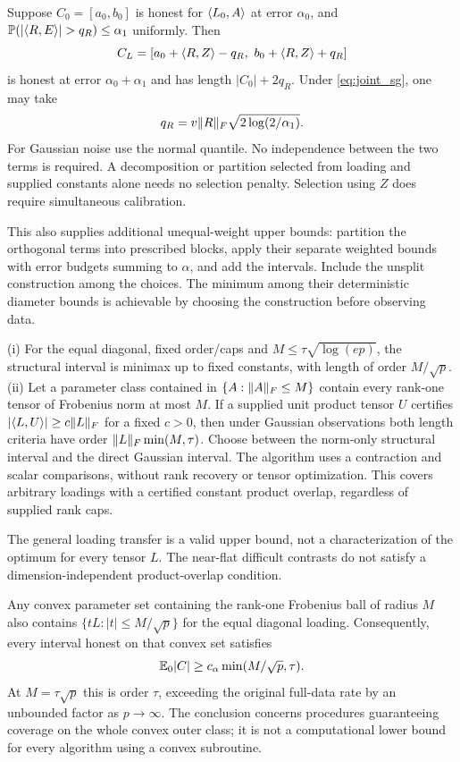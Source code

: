 \begin{proposition}\label{prop:loading_transfer}
Suppose $C_0=[a_0,b_0]$ is honest for $\langle L_0,A\rangle$ at error $\alpha_0$, and
$\PP(|\ip RE|>q_R)\le\alpha_1$ uniformly. Then
\[
 C_L=[a_0+\ip RZ-q_R,\ b_0+\ip RZ+q_R]
\]
is honest at error $\alpha_0+\alpha_1$ and has length $|C_0|+2q_R$.
Under \eqref{eq:joint_sg}, one may take
\[
 q_R=v\lVert R\rVert_F\sqrt{2\log(2/\alpha_1)}.
\]
For Gaussian noise use the normal quantile. No independence between the two terms is required. A decomposition or partition selected from loading and supplied constants alone needs no selection penalty. Selection using $Z$ does require simultaneous calibration.

This also supplies additional unequal-weight upper bounds: partition the orthogonal terms into prescribed blocks, apply their separate weighted bounds with error budgets summing to $\alpha$, and add the intervals. Include the unsplit construction among the choices. The minimum among their deterministic diameter bounds is achievable by choosing the construction before observing data.
\end{proposition}

\begin{theorem}\label{thm:efficient_regimes}
(i) For the equal diagonal, fixed order/caps and $M\le\tau\sqrt{\log(ep)}$, the structural interval is minimax up to fixed constants, with length of order $M/\sqrt p$.
(ii) Let a parameter class contained in $\{A:\lVert A\rVert_F\le M\}$ contain every rank-one tensor of Frobenius norm at most $M$. If a supplied unit product tensor $U$ certifies
$|\langle L,U\rangle|\ge c\lVert L\rVert_F$ for a fixed $c>0$, then under Gaussian observations both length criteria have order $\lVert L\rVert_F\min(M,\tau)$. Choose between the norm-only structural interval and the direct Gaussian interval. The algorithm uses a contraction and scalar comparisons, without rank recovery or tensor optimization. This covers arbitrary loadings with a certified constant product overlap, regardless of supplied rank caps.
\end{theorem}

The general loading transfer is a valid upper bound, not a characterization of the optimum for every tensor $L$. The near-flat difficult contrasts do not satisfy a dimension-independent product-overlap condition.

\begin{proposition}\label{prop:convex_loss}
Any convex parameter set containing the rank-one Frobenius ball of radius $M$ also contains $\{tL:|t|\le M/\sqrt p\}$ for the equal diagonal loading. Consequently, every interval honest on that convex set satisfies
\[
 \mathbb E_0|C|\ge c_\alpha\min(M/\sqrt p,\tau).
\]
At $M=\tau\sqrt p$ this is order $\tau$, exceeding the original full-data rate by an unbounded factor as $p\to\infty$. The conclusion concerns procedures guaranteeing coverage on the whole convex outer class; it is not a computational lower bound for every algorithm using a convex subroutine.
\end{proposition}

